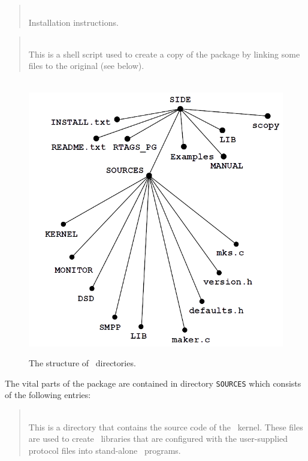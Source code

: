 \begin{quote}
\noindent{}\\ \hspace{0in}
Installation instructions.
\end{quote}

\begin{quote}
\noindent{}\\ \hspace{0in}
This is a shell script used to create a copy of the package by
linking some files to the original (see below).
\end{quote}\medskip

\begin{figure}
\begin{center}
\ \includegraphics[scale=0.5]{FIGURES/sds.png}
\caption{The structure of \smurph\ directories.}%
\end{center}%
\end{figure}%

The vital parts of the package are contained in directory {\tt SOURCES}
which consists of the following entries:

\medskip

\begin{quote}
\noindent{}\\ \hspace{0in}
This is a directory that contains the source code of the \smurph\ kernel.
These files are used to create \smurph\ libraries that are configured with
the user-supplied protocol files into stand-alone \smurph\ programs.
\end{quote}

